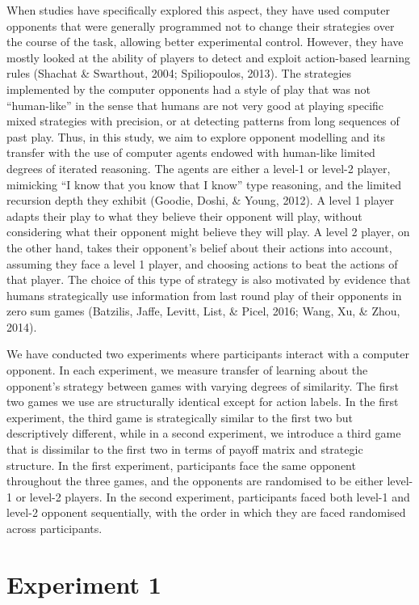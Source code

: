 \documentclass[man,floatsintext]{apa6}
\begin{document}
When studies have specifically explored this aspect, they have used computer opponents that were generally programmed not to change their strategies over the course of the task, allowing better experimental control. However, they have mostly looked at the ability of players to detect and exploit action-based learning rules (Shachat \& Swarthout, 2004; Spiliopoulos, 2013). The strategies implemented by the computer opponents had a style of play that was not \enquote{human-like} in the sense that humans are not very good at playing specific mixed strategies with precision, or at detecting patterns from long sequences of past play. Thus, in this study, we aim to explore opponent modelling and its transfer with the use of computer agents endowed with human-like limited degrees of iterated reasoning. The agents are either a level-1 or level-2 player, mimicking ``I know that you know that I know'' type reasoning, and the limited recursion depth they exhibit (Goodie, Doshi, \& Young, 2012). A level 1 player adapts their play to what they believe their opponent will play, without considering what their opponent might believe they will play. A level 2 player, on the other hand, takes their opponent's belief about their actions into account, assuming they face a level 1 player, and choosing actions to beat the actions of that player. The choice of this type of strategy is also motivated by evidence that humans strategically use information from last round play of their opponents in zero sum games (Batzilis, Jaffe, Levitt, List, \& Picel, 2016; Wang, Xu, \& Zhou, 2014).

We have conducted two experiments where participants interact with a computer opponent. In each experiment, we measure transfer of learning about the opponent's strategy between games with varying degrees of similarity. The first two games we use are structurally identical except for action labels. In the first experiment, the third game is strategically similar to the first two but descriptively different, while in a second experiment, we introduce a third game that is dissimilar to the first two in terms of payoff matrix and strategic structure. In the first experiment, participants face the same opponent throughout the three games, and the opponents are randomised to be either level-1 or level-2 players. In the second experiment, participants faced both level-1 and level-2 opponent sequentially, with the order in which they are faced randomised across participants.

\newpage

\hypertarget{experiment-1}{%
\section{Experiment 1}\label{experiment-1}}
\end{document}
